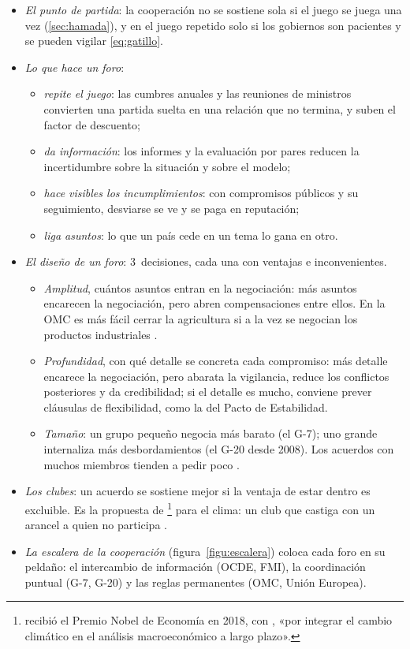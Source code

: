 \documentclass[11pt]{article}
\begin{document}
\begin{itemize}
\item \emph{El punto de partida}: la cooperación no se sostiene sola si el juego se juega una vez (\ref{sec:hamada}), y en el juego repetido solo si los gobiernos son pacientes y se pueden vigilar \eqref{eq:gatillo}.
\item \emph{Lo que hace un foro}:
  \begin{itemize}
  \item \emph{repite el juego}: las cumbres anuales y las reuniones de ministros convierten una partida suelta en una relación que no termina, y suben el factor de descuento;
  \item \emph{da información}: los informes y la evaluación por pares reducen la incertidumbre sobre la situación y sobre el modelo;
  \item \emph{hace visibles los incumplimientos}: con compromisos públicos y su seguimiento, desviarse se ve y se paga en reputación;
  \item \emph{liga asuntos}: lo que un país cede en un tema lo gana en otro.
  \end{itemize}
\item \emph{El diseño de un foro}: 3~decisiones, cada una con ventajas e inconvenientes.
  \begin{itemize}
  \item \emph{Amplitud}, cuántos asuntos entran en la negociación: más asuntos encarecen la negociación, pero abren compensaciones entre ellos. En la OMC es más fácil cerrar la agricultura si a la vez se negocian los productos industriales .
  \item \emph{Profundidad}, con qué detalle se concreta cada compromiso: más detalle encarece la negociación, pero abarata la vigilancia, reduce los conflictos posteriores y da credibilidad; si el detalle es mucho, conviene prever cláusulas de flexibilidad, como la del Pacto de Estabilidad.
  \item \emph{Tamaño}: un grupo pequeño negocia más barato (el G-7); uno grande internaliza más desbordamientos (el G-20 desde 2008). Los acuerdos con muchos miembros tienden a pedir poco .
  \end{itemize}
\item \emph{Los clubes}: un acuerdo se sostiene mejor si la ventaja de estar dentro es excluible. Es la propuesta de \textcite{Nordhaus2015Climate}\footnote{ recibió el Premio Nobel de Economía en 2018, con , «por integrar el cambio climático en el análisis macroeconómico a largo plazo»\nocite{Nobel2018Nordhaus}.} para el clima: un club que castiga con un arancel a quien no participa .
\item \emph{La escalera de la cooperación} (figura~\ref{figu:escalera}) coloca cada foro en su peldaño: el intercambio de información (OCDE, FMI), la coordinación puntual (G-7, G-20) y las reglas permanentes (OMC, Unión Europea).
\end{itemize}
\end{document}
